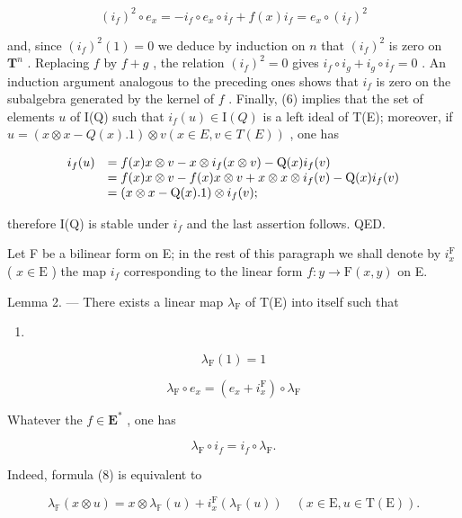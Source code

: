 \[
(i _ {f}) ^ {2} \circ e _ {x} = - i _ {f} \circ e _ {x} \circ i _ {f} + f (x) i _ {f} = e _ {x} \circ (i _ {f}) ^ {2}
\]

and, since \((i_f)^2(1) = 0\) we deduce by induction on \(n\) that \((i_f)^2\) is zero on \(\mathbf{T}^n\) . Replacing \(f\) by \(f + g\) , the relation \((i_f)^2 = 0\) gives \(i_f \circ i_g + i_g \circ i_f = 0\) . An induction argument analogous to the preceding ones shows that \(i_f\) is zero on the subalgebra generated by the kernel of \(f\) . Finally, (6) implies that the set of elements \(u\) of I(Q) such that \(i_f(u) \in \mathrm{I}(Q)\) is a left ideal of T(E); moreover, if \(u = (x \otimes x - Q(x).1) \otimes v (x \in E, v \in T(E))\) , one has

\[
\begin{array}{r l} i _ {f} (u) & = f (x) x \otimes v - x \otimes i _ {f} (x \otimes v) - \mathrm{Q} (x) i _ {f} (v) \\ & = f (x) x \otimes v - f (x) x \otimes v + x \otimes x \otimes i _ {f} (v) - \mathrm{Q} (x) i _ {f} (v) \\ & = (x \otimes x - \mathrm{Q} (x). 1) \otimes i _ {f} (v); \end{array}
\]

therefore I(Q) is stable under \(i_{f}\) and the last assertion follows. QED.

Let F be a bilinear form on E; in the rest of this paragraph we shall denote by \(i_x^{\mathrm{F}}\) ( \(x \in \mathrm{E}\) ) the map \(i_f\) corresponding to the linear form \(f: y \to \mathrm{F}(x, y)\) on E.

Lemma 2. --- There exists a linear map \(\lambda_{\mathrm{F}}\) of T(E) into itself such that

\begin{enumerate}
\def\labelenumi{(\arabic{enumi})}
\setcounter{enumi}{6}
\tightlist
\item
\end{enumerate}

\[
\lambda_ {\mathrm{F}} (1) = 1\tag{8}
\]

\[
\lambda_ {\mathrm{F}} \circ e _ {x} = (e _ {x} + i _ {x} ^ {\mathrm{F}}) \circ \lambda_ {\mathrm{F}}\tag{\( (x \in E) \) .}
\]

Whatever the \(f \in \mathbf{E}^*\) , one has

\[
\lambda_ {\mathrm{F}} \circ i _ {f} = i _ {f} \circ \lambda_ {\mathrm{F}}.\tag{9}
\]

Indeed, formula (8) is equivalent to

\[
\lambda_ {\mathbb {F}} (x \otimes u) = x \otimes \lambda_ {\mathbb {F}} (u) + i _ {x} ^ {\mathrm{F}} (\lambda_ {\mathbb {F}} (u)) \quad (x \in \mathrm{E}, u \in \mathrm{T} (\mathrm{E})).\tag{10}
\]

